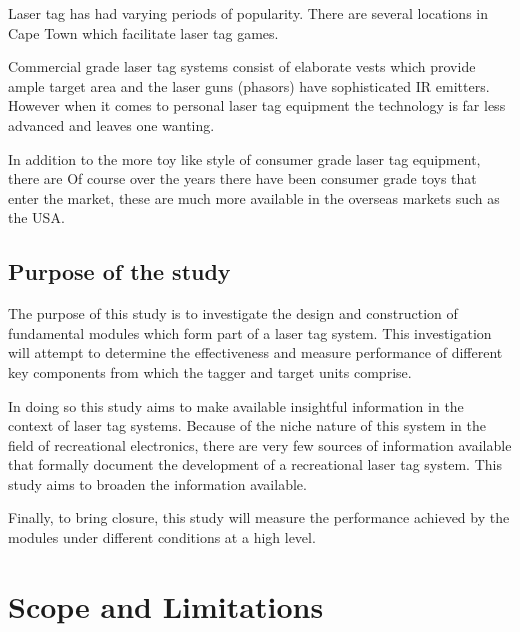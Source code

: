 Laser tag has had varying periods of popularity.
There are several locations in Cape Town which facilitate laser tag games.

Commercial grade laser tag systems consist of elaborate vests which provide ample target area and the laser guns (phasors) have sophisticated IR emitters. However when it comes to personal laser tag equipment the technology is far less advanced and leaves one wanting.

In addition to the more toy like style of consumer grade laser tag equipment, there are  Of course over the years there have been consumer grade toys that enter the market, these are much more available in the overseas markets such as the USA.

\subsection{Purpose of the study}



The purpose of this study is to investigate the design and construction of fundamental modules which form part of a laser tag system. This investigation will attempt to determine the effectiveness and measure performance of different key components from which the tagger and target units comprise.

In doing so this study aims to make available insightful information in the context of laser tag systems. Because of the niche nature of this system in the field of recreational electronics, there are very few sources of information available that formally document the development of a recreational laser tag system. This study aims to broaden the information available.

Finally, to bring closure, this study will measure the performance achieved by the modules under different conditions at a high level.


\section{Scope and Limitations}

